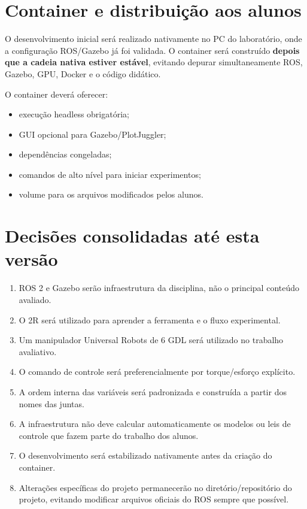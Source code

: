\documentclass[11pt,a4paper]{article}
\begin{document}
\section{Container e distribuição aos alunos}

O desenvolvimento inicial será realizado nativamente no PC do laboratório, onde a configuração ROS/Gazebo já foi validada. O container será construído \textbf{depois que a cadeia nativa estiver estável}, evitando depurar simultaneamente ROS, Gazebo, GPU, Docker e o código didático.

O container deverá oferecer:
\begin{itemize}
  \item execução headless obrigatória;
  \item GUI opcional para Gazebo/PlotJuggler;
  \item dependências congeladas;
  \item comandos de alto nível para iniciar experimentos;
  \item volume para os arquivos modificados pelos alunos.
\end{itemize}

\section{Decisões consolidadas até esta versão}

\begin{enumerate}
  \item ROS 2 e Gazebo serão infraestrutura da disciplina, não o principal conteúdo avaliado.
  \item O 2R será utilizado para aprender a ferramenta e o fluxo experimental.
  \item Um manipulador Universal Robots de 6 GDL será utilizado no trabalho avaliativo.
  \item O comando de controle será preferencialmente por torque/esforço explícito.
  \item A ordem interna das variáveis será padronizada e construída a partir dos nomes das juntas.
  \item A infraestrutura não deve calcular automaticamente os modelos ou leis de controle que fazem parte do trabalho dos alunos.
  \item O desenvolvimento será estabilizado nativamente antes da criação do container.
  \item Alterações específicas do projeto permanecerão no diretório/repositório do projeto, evitando modificar arquivos oficiais do ROS sempre que possível.
\end{enumerate}
\end{document}
